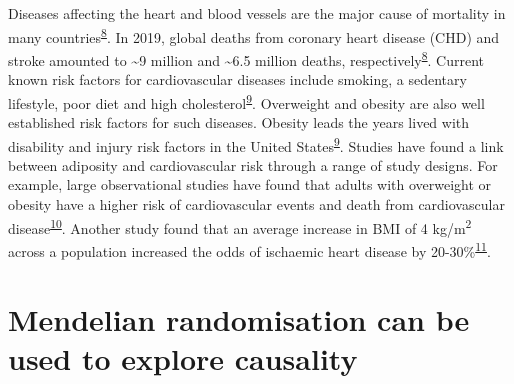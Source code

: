 \documentclass[11pt,twoside]{bristolthesis}
\begin{document}
Diseases affecting the heart and blood vessels are the major cause of mortality in many countries\textsuperscript{\protect\hyperlink{ref-BritishHeartFoundation2021}{8}}. In 2019, global deaths from coronary heart disease (CHD) and stroke amounted to \textasciitilde9 million and \textasciitilde6.5 million deaths, respectively\textsuperscript{\protect\hyperlink{ref-BritishHeartFoundation2021}{8}}. Current known risk factors for cardiovascular diseases include smoking, a sedentary lifestyle, poor diet and high cholesterol\textsuperscript{\protect\hyperlink{ref-Virani2021}{9}}. Overweight and obesity are also well established risk factors for such diseases. Obesity leads the years lived with disability and injury risk factors in the United States\textsuperscript{\protect\hyperlink{ref-Virani2021}{9}}. Studies have found a link between adiposity and cardiovascular risk through a range of study designs. For example, large observational studies have found that adults with overweight or obesity have a higher risk of cardiovascular events and death from cardiovascular disease\textsuperscript{\protect\hyperlink{ref-Khan2018}{10}}. Another study found that an average increase in BMI of 4 kg/m\textsuperscript{2} across a population increased the odds of ischaemic heart disease by 20-30\%\textsuperscript{\protect\hyperlink{ref-Nordestgaard2012}{11}}.

\hypertarget{mendelian-randomisation-can-be-used-to-explore-causality}{%
\section{Mendelian randomisation can be used to explore causality}\label{mendelian-randomisation-can-be-used-to-explore-causality}}
\end{document}
